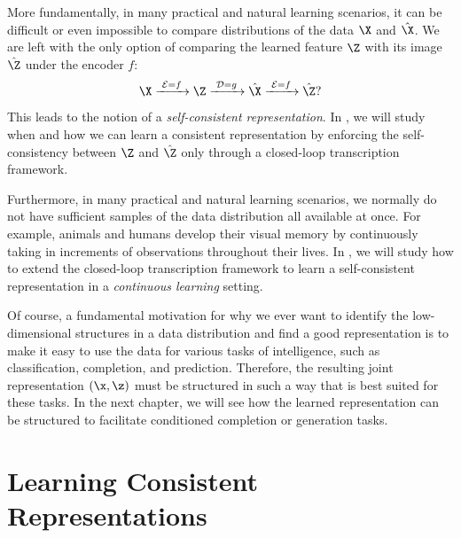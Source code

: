 \documentclass[../../book-main.tex]{subfiles}
\begin{document}
More fundamentally, in many practical and natural learning scenarios, it can be difficult or even impossible to compare distributions of the data $\X$ and $\hat \X$. We are left with the only option of comparing the learned feature $\Z$ with its image $\hat \Z$ under the encoder $f$: 
\begin{equation}
 \X
\xrightarrow{\hspace{1mm} \mathcal{E} = f \hspace{1mm}} \Z  \xrightarrow{\hspace{1mm} \mathcal{D} = g \hspace{1mm}} \hat{\X} \xrightarrow{\hspace{1mm} \mathcal{E} = f \hspace{1mm}} \hat \Z?
\end{equation}
This leads to the notion of a {\em self-consistent representation}. In , we will study when and how we can learn a consistent representation by enforcing the self-consistency between $\Z$ and $\hat \Z$ only through a closed-loop transcription framework. 

Furthermore, in many practical and natural learning scenarios, we normally do not have sufficient samples of the data distribution all available at once. For example, animals and humans develop their visual memory by continuously taking in increments of observations throughout their lives. In , we will study how to extend the closed-loop transcription framework to learn a self-consistent representation in a  {\em continuous learning} setting.

Of course, a fundamental motivation for why we ever want to identify the
low-dimensional structures in a data distribution and find a good
representation is to make it easy to use the data for various tasks
of intelligence, such as classification, completion, and prediction.
Therefore, the resulting joint representation $(\x, \z)$ must be
structured in such a way that is best suited for these tasks. In the
next chapter, we will
see how the learned representation can be structured to facilitate
conditioned completion or generation tasks.






\section{Learning Consistent Representations}\label{sec:consistent-representation}
\end{document}
